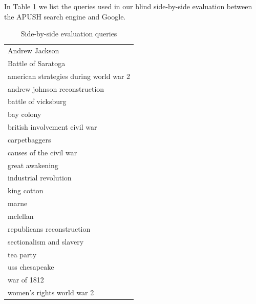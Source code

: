\documentclass[pdfpagelabels=false,plainpages=true]{acm_proc_article-sp}
\begin{document}
In Table \ref{tab-queries} we list the queries used in our blind side-by-side
evaluation between the APUSH search engine and Google.


\begin{table}
\begin{center}
\begin{tabular}{|l|} \hline
Andrew Jackson \\
Battle of Saratoga \\
american strategies during world war 2 \\
andrew johnson reconstruction \\
battle of vicksburg \\
bay colony \\
british involvement civil war \\
carpetbaggers \\
causes of the civil war \\
great awakening \\
industrial revolution \\
king cotton \\
marne \\
mclellan \\
republicans reconstruction \\
sectionalism and slavery \\
tea party \\
uss chesapeake \\
war of 1812 \\
women's rights world war 2 \\
\hline\end{tabular}
\caption{Side-by-side evaluation queries}
\label{tab-queries}
\end{center}
\end{table}
\end{document}
